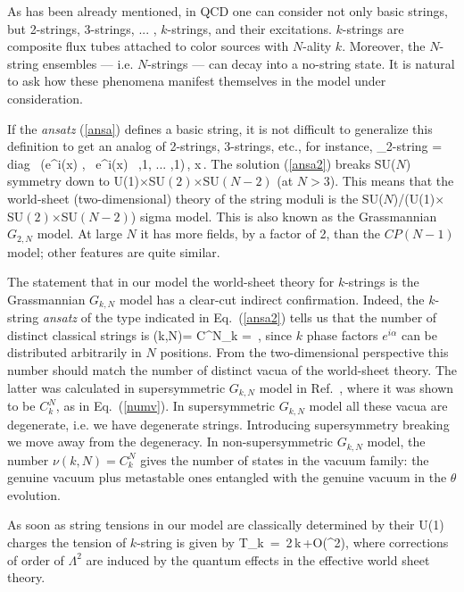 As has been already mentioned, in QCD one can consider
not only basic strings, but 2-strings, 3-strings, ... , $k$-strings,
and their excitations. $k$-strings are composite flux tubes
attached to color sources with $N$-ality $k$. 
Moreover, the $N$-string ensembles --- i.e. $N$-strings ---
can decay into a no-string state. It is natural to ask how
these phenomena manifest themselves in the model under consideration.

If the {\em ansatz} (\ref{ansa}) defines a basic string,
it is not difficult to generalize this definition
to get an analog of 2-strings, 3-strings, etc., for instance, 
\beq
\Phi_{\rm 2-string} = \sqrt{\xi}\,{\rm diag} \, (e^{i\alpha (x) }, \, e^{i\alpha (x) }
\, ,1, ... ,1)\,,
\quad x\to\infty \,.
\label{ansa2}
\eeq
The solution (\ref{ansa2})
breaks SU($N$) symmetry 
down  to U(1)$\times$SU$(2)$$\times$SU$(N-2)$  (at $N>3$).
This means that the world-sheet (two-dimensional) theory of 
the   string moduli
is the SU($N$)/(U(1)$\times$SU$(2)$$\times$SU$(N-2)$) sigma model.
This is also known as the Grassmannian $G_{2,N}$ model.
At large $N$ it has more fields, by a factor of 2,
than the $CP(N-1)$ model; other features are quite similar.

The statement that in our model the world-sheet theory for $k$-strings
is the Grassmannian $G_{k,N}$ model has   a clear-cut indirect
confirmation. Indeed, the $k$-string {\em ansatz} of the type 
indicated in Eq.~(\ref{ansa2}) tells us that the number of distinct
classical strings is 
\beq
\nu (k,N)= C^N_k = \,,
\label{numv}
\eeq
since $k$ phase factors
$e^{i\alpha}$ can be distributed arbitrarily in $N$ positions.
{}From the  two-dimensional perspective
this number should match the number of distinct vacua
of the world-sheet theory. The latter was calculated in supersymmetric
$G_{k,N}$ model in Ref.~\cite{CecV}, where it was shown
to be $C^N_k$, as in Eq.~(\ref{numv}). In supersymmetric
$G_{k,N}$ model all these vacua are degenerate, i.e. we have degenerate
strings. Introducing supersymmetry breaking we move away from 
the degeneracy. In non-supersymmetric
$G_{k,N}$ model, the number  $\nu (k,N)=  C^N_k$ gives the 
number of states
in the vacuum family: the genuine vacuum plus metastable ones
entangled with the genuine vacuum in the $\theta$ evolution.

As soon as string  tensions in our model are classically determined by their
U(1) charges the tension of $k$-string is given by
\beq
T_k\, =\, 2\pi\,k\,\xi +O(\Lambda^2),
\label{kten}
\eeq
where corrections of order of $\Lambda^2$ are induced by the quantum effects
in the effective world sheet theory.


